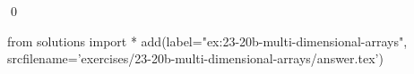 
\begin{ex} 
  \label{ex:23-20b-multi-dimensional-arrays}
  
  \qed
\end{ex} 
\begin{python0}
from solutions import *
add(label="ex:23-20b-multi-dimensional-arrays",
    srcfilename='exercises/23-20b-multi-dimensional-arrays/answer.tex') 
\end{python0}
